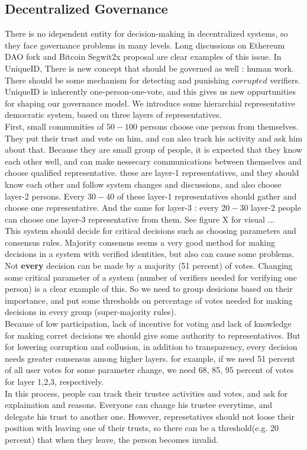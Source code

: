 \documentclass{article}
\begin{document}
\subsection{Decentralized Governance}
There is no idependent entity for decision-making in decentralized systems, so they face governance problems in many levels. Long discussions on Ethereum DAO fork and Bitcoin Segwit2x proposal are clear examples of this issue. In UniqueID, There is new concept that should be governed as well : human work. There should be some mechanism for detecting and punishing $corrupted$ verifiers.
\\
UniqueID is inherently one-person-one-vote, and this gives us new oppurtunities for shaping our governance model. We introduce some hierarchial representative democratic system, based on three layers of representatives. 
\\
First, small communities of $50-100$ persons choose one person from themselves. They put their trust and vote on him, and can also track his activity and ask him about that. Because they are small group of people, it is expected that they know each other well, and can make nessecary communications between themselves and choose qualified representative. these are layer-1 representatives, and they should know each other and follow system changes and discussions, and also choose layer-2 persons. Every $30-40$ of these layer-1 representatives should gather and choose one representative. And the same for layer-3 : every $20-30$ layer-2 people can choose one layer-3 representative from them. See figure X for visual ...
\\
This system should decide for critical decisions such as choosing parameters and consensus rules. Majority consensus seems a very good method for making decisions in a system with verified identities, but also can cause some problems. Not \textbf{every} decision can be made by a majority (51 percent) of votes. Changing some critical parameter of a system (number of verifiers needed for verifying one person) is a clear example of this. So we need to group desicions based on their importance, and put some thresholds on percentage of votes needed for making decisions in every group (super-majority rules).
\\
Because of low participation, lack of incentive for voting and lack of knowledge for making corret decisions we should give some authority to representatives. But for lowering corruption and collusion, in addition to transparency, every decision needs greater consensus among higher layers. for example, if we need 51 percent of all user votes for some parameter change, we need 68, 85, 95 percent  of votes for layer 1,2,3, respectively.
\\
In this process, people can track their trustee activities and votes, and ask for explaination and reasons. Everyone can change his trustee everytime, and delegate his trust to another one. However, represetatives should not loose their position with leaving one of their trusts, so there can be a threshold(e.g. 20 percent) that when they leave, the person becomes invalid. \\
\end{document}
